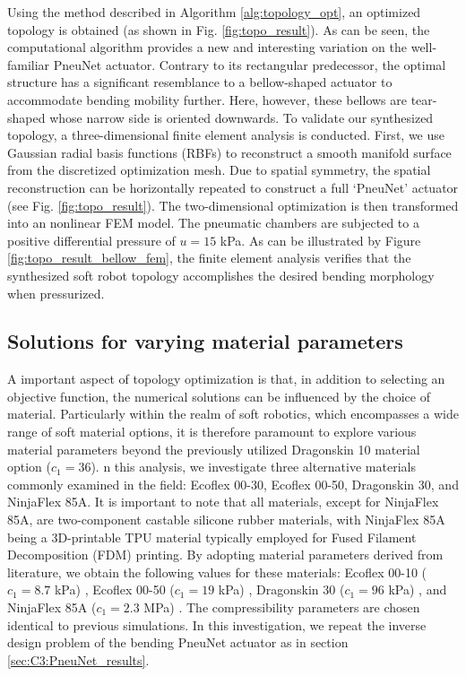 Using the method described in Algorithm \ref{alg:topology_opt}, an optimized topology is obtained (as shown in Fig. \ref{fig:topo_result}). As can be seen, the computational algorithm provides a new and interesting variation on the well-familiar PneuNet actuator. Contrary to its rectangular predecessor, the optimal structure has a significant resemblance to a bellow-shaped actuator to accommodate bending mobility further. Here, however, these bellows are tear-shaped whose narrow side is oriented downwards. To validate our synthesized topology, a three-dimensional finite element analysis is conducted. First, we use Gaussian radial basis functions (RBFs) to reconstruct a smooth manifold surface from the discretized optimization mesh. Due to spatial symmetry, the spatial reconstruction can be horizontally repeated to construct a full `PneuNet' actuator (see Fig. \ref{fig:topo_result}). The two-dimensional optimization is then transformed into an nonlinear FEM model. The pneumatic chambers are subjected to a positive differential pressure of $u = 15$ kPa. As can be illustrated by Figure \ref{fig:topo_result_bellow_fem}, the finite element analysis verifies that the synthesized soft robot topology accomplishes the desired bending morphology when pressurized.

\subsection{Solutions for varying material parameters}
A important aspect of topology optimization is that, in addition to selecting an objective function, the numerical solutions can be influenced by the choice of material. Particularly within the realm of soft robotics, which encompasses a wide range of soft material options, it is therefore paramount to explore various material parameters beyond the previously utilized Dragonskin 10 material option ($c_1 = 36$). n this analysis, we investigate three alternative materials commonly examined in the field: Ecoflex 00-30, Ecoflex 00-50, Dragonskin 30, and NinjaFlex 85A. It is important to note that all materials, except for NinjaFlex 85A, are two-component castable silicone rubber materials, with NinjaFlex 85A being a 3D-printable TPU material typically employed for Fused Filament Decomposition (FDM) printing. By adopting material parameters derived from literature, we obtain the following values for these materials: Ecoflex 00-10 ($c_1 = 8.7$ kPa) \cite{Marechal2021Jun}, Ecoflex 00-50 ($c_1 = 19$ kPa) \cite{Xavier2022Jun,Xavier2021Feb}, Dragonskin 30 ($c_1 = 96$ kPa)  \cite{Marechal2021Jun,Xavier2021Feb}, and NinjaFlex 85A ($c_1 = 2.3$ MPa) \cite{Xavier2021Feb}. The compressibility parameters are chosen identical to previous simulations. In this investigation, we repeat the inverse design problem of the bending PneuNet actuator as in section \ref{sec:C3:PneuNet_results}.

